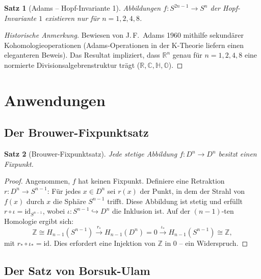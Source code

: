 \documentclass[12pt,a4paper]{amsart}
\newtheorem{theorem}{Satz}[section]
\theoremstyle{definition}
\begin{document}
\begin{theorem}[Adams -- Hopf-Invariante 1]
\label{thm:adams}
Abbildungen $f\colon S^{2n-1} \to S^n$ der Hopf-Invariante $1$ existieren nur
f\"ur $n = 1, 2, 4, 8$.
\end{theorem}
\begin{proof}[Historische Anmerkung]
Bewiesen von J.\,F.~Adams 1960 mithilfe sekund\"arer Kohomologieoperationen
(Adams-Operationen in der K-Theorie liefern einen eleganteren Beweis).
Das Resultat impliziert, dass $\mathbb{R}^n$ genau f\"ur $n = 1, 2, 4, 8$
eine normierte Divisionsalgebrenstruktur tr\"agt ($\mathbb{R}, \mathbb{C},
\mathbb{H}, \mathbb{O}$).
\end{proof}

\section{Anwendungen}
\label{sec:anwendungen}

\subsection{Der Brouwer-Fixpunktsatz}

\begin{theorem}[Brouwer-Fixpunktsatz]
\label{thm:brouwer}
Jede stetige Abbildung $f\colon D^n \to D^n$ besitzt einen Fixpunkt.
\end{theorem}
\begin{proof}
Angenommen, $f$ hat keinen Fixpunkt. Definiere eine Retraktion
$r\colon D^n \to S^{n-1}$: F\"ur jedes $x \in D^n$ sei $r(x)$ der Punkt,
in dem der Strahl von $f(x)$ durch $x$ die Sph\"are $S^{n-1}$ trifft.
Diese Abbildung ist stetig und erf\"ullt $r \circ \iota = \mathrm{id}_{S^{n-1}}$,
wobei $\iota\colon S^{n-1} \hookrightarrow D^n$ die Inklusion ist.
Auf der $(n-1)$-ten Homologie ergibt sich:
\[
  \mathbb{Z} \cong H_{n-1}(S^{n-1})
  \xrightarrow{r_*} H_{n-1}(D^n) = 0
  \xrightarrow{\iota_*} H_{n-1}(S^{n-1}) \cong \mathbb{Z},
\]
mit $r_* \circ \iota_* = \mathrm{id}$. Dies erfordert eine Injektion von
$\mathbb{Z}$ in $0$ -- ein Widerspruch.
\end{proof}

\subsection{Der Satz von Borsuk-Ulam}
\end{document}
